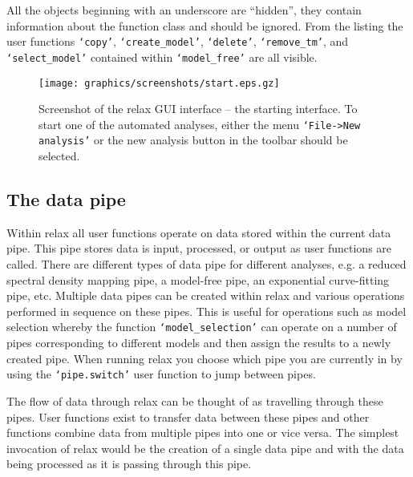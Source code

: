 All the objects beginning with an underscore are ``hidden'', they contain information about the function class and should be ignored.  From the listing the user functions \texttt{`copy'}, \texttt{`create\_model'}, \texttt{`delete'}, \texttt{`remove\_tm'}, and \texttt{`select\_model'} contained within \texttt{`model\_free'} are all visible.

\begin{figure}
\centerline{\texttt{[image: graphics/screenshots/start.eps.gz]}}
\caption[GUI screenshot]{Screenshot of the relax GUI interface -- the starting interface.  To start one of the automated analyses, either the menu \texttt{`File->New analysis'} or the new analysis button in the toolbar should be selected.}\label{fig: GUI screenshot - start}
\end{figure}




\subsection{The data pipe} \label{sect: the data pipe}

Within relax all user functions operate on data stored within the current data pipe.  This pipe stores data is input, processed, or output as user functions are called.  There are different types of data pipe for different analyses, e.g. a reduced spectral density mapping pipe, a model-free pipe, an exponential curve-fitting pipe, etc.  Multiple data pipes can be created within relax and various operations performed in sequence on these pipes.  This is useful for operations such as model selection whereby the function \texttt{`model\_selection'} can operate on a number of pipes corresponding to different models and then assign the results to a newly created pipe.  When running relax you choose which pipe you are currently in by using the \texttt{`pipe.switch'} user function to jump between pipes. 

The flow of data through relax can be thought of as travelling through these pipes.  User functions exist to transfer data between these pipes and other functions combine data from multiple pipes into one or vice versa.  The simplest invocation of relax would be the creation of a single data pipe and with the data being processed as it is passing through this pipe.

